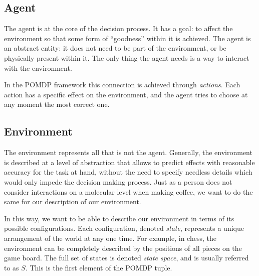 \subsection{Agent}

The agent is at the core of the decision process. It has a goal: to affect the environment so that
some form of ``goodness'' within it is achieved.  The agent is an abstract entity: it does not need
to be part of the environment, or be physically present within it. The only thing the agent needs is
a way to interact with the environment.


In the POMDP framework this connection is achieved through \textit{actions}. Each action has a
specific effect on the environment, and the agent tries to choose at any moment the most correct
one.

\subsection{Environment}

The environment represents all that is not the agent. Generally, the environment is described at a
level of abstraction that allows to predict effects with reasonable accuracy for the task at hand,
without the need to specify needless details which would only impede the decision making process.
Just as a person does not consider interactions on a molecular level when making coffee, we want to
do the same for our description of our environment.

In this way, we want to be able to describe our environment in terms of its possible configurations.
Each configuration, denoted \textit{state}, represents a unique arrangement of the world at any one
time. For example, in chess, the environment can be completely described by the positions of all
pieces on the game board. The full set of states is denoted \textit{state space}, and is usually
referred to as $S$. This is the first element of the POMDP tuple.


